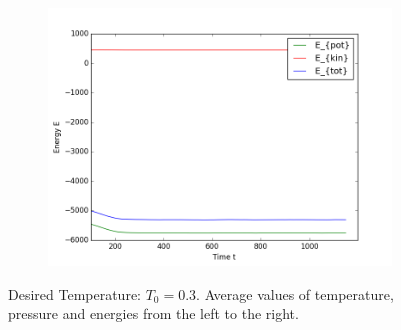 \begin{figure}[ht]
\begin{subfigure}{0.3\textwidth}
\end{subfigure}
\hfill
\begin{subfigure}{0.3\textwidth}
\includegraphics[width=\textwidth]{fig/avEnergies_T0d3_F20d0_M100.png}
\end{subfigure}
\caption{
Desired Temperature: $T_0=0.3$.
Average values of temperature, pressure and energies from the left to the right.}
\label{9T0d3}
\end{figure}

